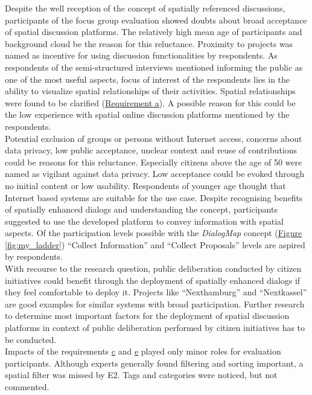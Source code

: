 Despite the well reception of the concept of spatially referenced discussions, participants of the focus group evaluation showed doubts about broad acceptance of spatial discussion platforms. The relatively high mean age of participants and background cloud be the reason for this reluctance. Proximity to projects was named as incentive for using discussion functionalities by respondents. As respondents of the semi-structured interviews mentioned informing the public as one of the most useful aspects, focus of interest of the respondents lies in the ability to visualize spatial relationships of their activities. Spatial relationships were found to be clarified (\hyperref[req:a]{Requirement a}). A possible reason for this could be the low experience with spatial online discussion platforms mentioned by the respondents.\\
Potential exclusion of groups or persons without Internet access, concerns about data privacy, low public acceptance, unclear context and reuse of contributions could be reasons for this reluctance. Especially citizens above the age of 50 were named as vigilant against data privacy. Low acceptance could be evoked through no initial content or low usability. Respondents of younger age thought that Internet based systems are suitable for the use case. Despite recognising benefits of spatially enhanced dialogs and understanding the concept, participants suggested to use the developed platform to convey information with spatial aspects. Of the participation levels possible with the \textit{DialogMap} concept (\hyperref[fig:my_ladder]{Figure \ref{fig:my_ladder}}) ``Collect Information'' and ``Collect Proposals'' levels are aspired by respondents.\\
With recourse to the research question, public deliberation conducted by citizen initiatives could benefit through the deployment of spatially enhanced dialogs if they feel comfortable to deploy it. Projects like ``Nexthamburg'' and ``Nextkassel'' are good examples for similar systems with broad participation. Further research to determine most important factors for the deployment of spatial discussion platforms in context of public deliberation performed by citizen initiatives has to be conducted.\\
Impacts of the requirements \hyperref[req:c]{c} and \hyperref[req:e]{e} played only minor roles for evaluation participants. Although experts generally found filtering and sorting important, a spatial filter was missed by E2. Tags and categories were noticed, but not commented. 

